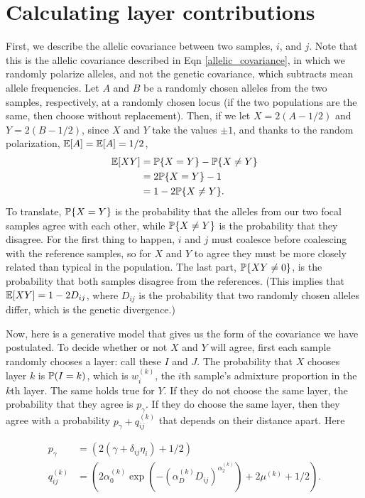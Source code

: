 \documentclass[12pt]{article}
\begin{document}
\newpage
\section{Calculating layer contributions}\label{layer_contribution}
First, we describe the allelic covariance between two samples, $i$, and $j$.
Note that this is the allelic covariance described in Eqn \eqref{allelic_covariance},
in which we randomly polarize alleles,
and not the genetic covariance, which subtracts mean allele frequencies.
Let $A$ and $B$ be a randomly chosen alleles from the two samples, respectively,
at a randomly chosen locus 
(if the two populations are the same, then choose without replacement).
Then, if we let $X=2(A-1/2)$ and $Y=2(B-1/2)$,
since $X$ and $Y$ take the values $\pm 1$,
and thanks to the random polarization, $\E[A] = \E[A] = 1/2$,
$$\begin{aligned}
\E[XY]
        &= \P\{ X=Y \} - \P\{ X \neq Y \} \\
        &= 2 \P\{ X=Y \} - 1 \\
        &= 1 - 2 \P\{ X \neq Y \} .
\end{aligned}$$
To translate, $\P\{ X=Y \}$ is the probability that the alleles from our two focal samples agree with each other,
while $\P\{ X \neq Y \}$ is the probability that they disagree.
For the first thing to happen, $i$ and $j$ must coalesce before coalescing with the reference samples,
so for $X$ and $Y$ to agree they must be more closely related than typical in the population.
The last part, $\P\{ XY \neq 0\}$, is the probability that both samples disagree from the references.
(This implies that $\E[XY] = 1 - 2 D_{ij}$, 
where $D_{ij}$ is the probability that two randomly chosen alleles differ, 
which is the genetic divergence.) 

Now, here is a generative model that gives us the form of the covariance we have postulated.
To decide whether or not $X$ and $Y$ will agree,
first each sample randomly chooses a layer: call these $I$ and $J$.
The probability that $X$ chooses layer $k$ is $\P({I=k})$, which is $w_i^{(k)}$, 
the $i$th sample's admixture proportion in the $k$th layer.
The same holds true for $Y$.
If they do not choose the same layer, the probability that they agree is $p_\gamma$.
If they do choose the same layer, 
then they agree with a probability $p_\gamma + q^{(k)}_{ij}$ that depends on their distance apart.
Here

$$\begin{aligned}
    p_\gamma &= (2 (\gamma + \delta_{ij} \eta_i) + 1/2) \\
    q^{(k)}_{ij} &= \left(2 \alpha_0^{(k)} \exp\left( - \left(\alpha_D^{(k)} D_{ij}\right)^{\alpha_2^{(k)}} \right) + 2 \mu^{(k)}  + 1/2 \right) .
\end{aligned}$$
\end{document}
